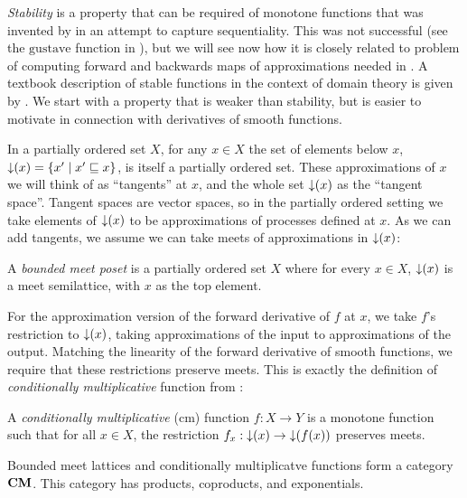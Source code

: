 \emph{Stability} is a property that can be required of monotone functions that was invented by \citet{berry79} in an attempt to capture sequentiality. This was not successful (see the $\mathrm{gustave}$ function in ), but we will see now how it is closely related to problem of computing forward and backwards maps of approximations needed in \GPS. A textbook description of stable functions in the context of domain theory is given by \citet[Chapter 12]{amadio-curien}. We start with a property that is weaker than stability, but is easier to motivate in connection with derivatives of smooth functions.

In a partially ordered set $X$, for any $x \in X$ the set of elements below $x$, $\mathop{\downarrow}(x) = \{ x' \mid x' \sqsubseteq x \}$, is itself a partially ordered set. These approximations of $x$ we will think of as ``tangents'' at $x$, and the whole set $\mathop{\downarrow}(x)$ as the ``tangent space''. Tangent spaces are vector spaces, so in the partially ordered setting we take elements of $\mathop{\downarrow}(x)$ to be approximations of processes defined at $x$. As we can add tangents, we assume we can take meets of approximations in $\mathop{\downarrow}(x)$:


\begin{definition}
  A \emph{bounded meet poset} is a partially ordered set $X$ where for
  every $x \in X$, $\mathop{\downarrow}(x)$ is a meet semilattice, with $x$ as
  the top element.
\end{definition}

For the approximation version of the forward derivative of $f$ at $x$, we take $f$'s restriction to $\mathop{\downarrow}(x)$, taking approximations of the input to approximations of the output. Matching the linearity of the forward derivative of smooth functions, we require that these restrictions preserve meets. This is exactly the definition of \emph{conditionally multiplicative} function from \citet{berry79}:

\begin{definition}
  A \emph{conditionally multiplicative} (cm) function $f : X \to Y$ is
  a monotone function such that for all $x \in X$, the restriction
  $f_x : \mathop{\downarrow}(x) \to \mathop{\downarrow}(f(x))$ preserves meets.
\end{definition}

\begin{theorem}
  Bounded meet lattices and conditionally multiplicatve functions form
  a category $\mathbf{CM}$. This category has products, coproducts, and
  exponentials.
\end{theorem}

